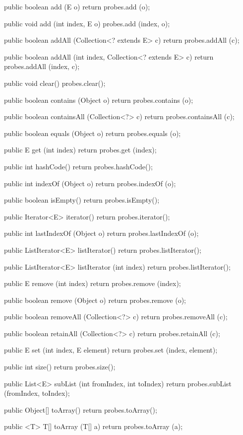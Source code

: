 \begin{code}
\begin{hide}

   public boolean add (E o) {
      return probes.add (o);
   }

   public void add (int index, E o) {
      probes.add (index, o);
   }

   public boolean addAll (Collection<? extends E> c) {
      return probes.addAll (c);
   }

   public boolean addAll (int index, Collection<? extends E> c) {
      return probes.addAll (index, c);
   }

   public void clear() {
      probes.clear();
   }

   public boolean contains (Object o) {
      return probes.contains (o);
   }

   public boolean containsAll (Collection<?> c) {
      return probes.containsAll (c);
   }

   public boolean equals (Object o) {
      return probes.equals (o);
   }

   public E get (int index) {
      return probes.get (index);
   }

   public int hashCode() {
      return probes.hashCode();
   }

   public int indexOf (Object o) {
      return probes.indexOf (o);
   }

   public boolean isEmpty() {
      return probes.isEmpty();
   }

   public Iterator<E> iterator() {
      return probes.iterator();
   }

   public int lastIndexOf (Object o) {
      return probes.lastIndexOf (o);
   }

   public ListIterator<E> listIterator() {
      return probes.listIterator();
   }

   public ListIterator<E> listIterator (int index) {
      return probes.listIterator();
   }

   public E remove (int index) {
      return probes.remove (index);
   }

   public boolean remove (Object o) {
      return probes.remove (o);
   }

   public boolean removeAll (Collection<?> c) {
      return probes.removeAll (c);
   }

   public boolean retainAll (Collection<?> c) {
      return probes.retainAll (c);
   }

   public E set (int index, E element) {
      return probes.set (index, element);
   }

   public int size() {
      return probes.size();
   }

   public List<E> subList (int fromIndex, int toIndex) {
      return probes.subList (fromIndex, toIndex);
   }

   public Object[] toArray() {
      return probes.toArray();
   }

   public <T> T[] toArray (T[] a) {
      return probes.toArray (a);
   }

\end{hide}
\end{code}
\begin{code}\begin{hide}
}\end{hide}
\end{code}

